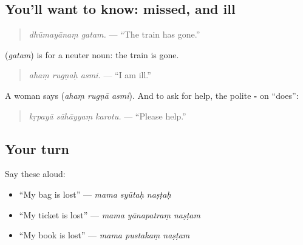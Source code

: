 \subsection*{You'll want to know: missed, and ill}
\begin{quote}
\textbf{ }
\end{quote}

\begin{quote}
\emph{dhūmayānaṃ gatam.} — \textquotedblleft{}The train has gone.\textquotedblright{}
\end{quote}

\textbf{} (\emph{gatam}) is \textbf{} for a neuter noun: the train is gone.

\begin{quote}
\textbf{  }
\end{quote}

\begin{quote}
\emph{ahaṃ rugṇaḥ asmi.} — \textquotedblleft{}I am ill.\textquotedblright{}
\end{quote}

A woman says \textbf{  } (\emph{ahaṃ rugṇā asmi}). And to ask for help, the polite \textbf{-} on \textquotedblleft{}does\textquotedblright{}:

\begin{quote}
\textbf{  }
\end{quote}

\begin{quote}
\emph{kṛpayā sāhāyyaṃ karotu.} — \textquotedblleft{}Please help.\textquotedblright{}
\end{quote}

\subsection*{Your turn}
Say these aloud:

\begin{itemize}
\raggedright
  \item \textquotedblleft{}My bag is lost\textquotedblright{} — \emph{mama syūtaḥ naṣṭaḥ}
  \item \textquotedblleft{}My ticket is lost\textquotedblright{} — \emph{mama yānapatraṃ naṣṭam}
  \item \textquotedblleft{}My book is lost\textquotedblright{} — \emph{mama pustakaṃ naṣṭam}
\end{itemize}

